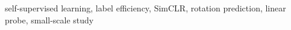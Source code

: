 self-supervised learning, label efficiency, SimCLR, rotation prediction, linear probe, small-scale study
